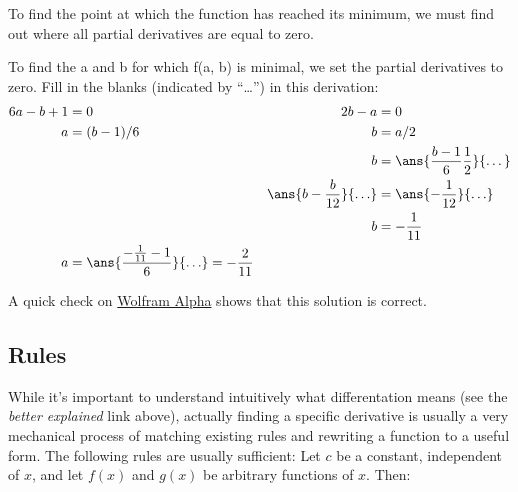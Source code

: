 \documentclass[11pt]{article}
\begin{document}

To find the point at which the function has reached its minimum, we must find out where all partial derivatives are equal to zero.\footnotemark
{}

\begin{Exercise} To find the a and b for which f(a, b) is minimal, we set the partial derivatives to zero. Fill in the blanks (indicated by ``\ldots'') in this derivation:
\begin{align*}
6a - b + 1 &= 0 & 2b-a &= 0 \\
a &= (b-1)/6 & b &= a/2 \\
 & & b &= \ans{\frac{b-1}{6}\frac{1}{2}}{\dots}\\ 
 & & \ans{b - \frac{b}{12}}{\ldots}&= \ans{- \frac{1}{12}}{\ldots}\\
  & & b &= -\frac{1}{11}\\
  a &= \ans{\frac{-\frac{1}{11} - 1}{6}}{\ldots}=-\frac{2}{11} & & \\
\end{align*}
\end{Exercise}

\noindent A quick check on \href{http://wolfr.am/9DrZFKcR}{Wolfram Alpha} shows that this solution is correct.

\subsection{Rules}

While it’s important to understand intuitively what differentation means (see the \emph{better explained} link above), actually finding a specific derivative is usually a very mechanical process of matching existing rules and rewriting a function to a useful form. The following rules are usually sufficient:
Let $c$ be a constant, independent of $x$, and let $f(x)$ and $g(x)$ be arbitrary functions of $x$. Then:
\end{document}
